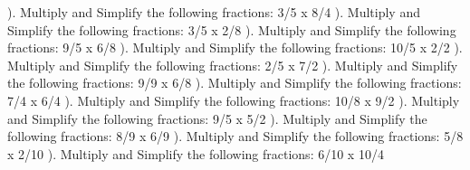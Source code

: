 \documentclass{article}%
\begin{document}
\newline%
\newline%
). Multiply and Simplify the following fractions: 3/5 x 8/4%
\newline%
\newline%
). Multiply and Simplify the following fractions: 3/5 x 2/8%
\newline%
\newline%
). Multiply and Simplify the following fractions: 9/5 x 6/8%
\newline%
\newline%
). Multiply and Simplify the following fractions: 10/5 x 2/2%
\newline%
\newline%
). Multiply and Simplify the following fractions: 2/5 x 7/2%
\newline%
\newline%
). Multiply and Simplify the following fractions: 9/9 x 6/8%
\newline%
\newline%
). Multiply and Simplify the following fractions: 7/4 x 6/4%
\newline%
\newline%
). Multiply and Simplify the following fractions: 10/8 x 9/2%
\newline%
\newline%
). Multiply and Simplify the following fractions: 9/5 x 5/2%
\newline%
\newline%
). Multiply and Simplify the following fractions: 8/9 x 6/9%
\newline%
\newline%
). Multiply and Simplify the following fractions: 5/8 x 2/10%
\newline%
\newline%
). Multiply and Simplify the following fractions: 6/10 x 10/4%
\newline%
\end{document}
